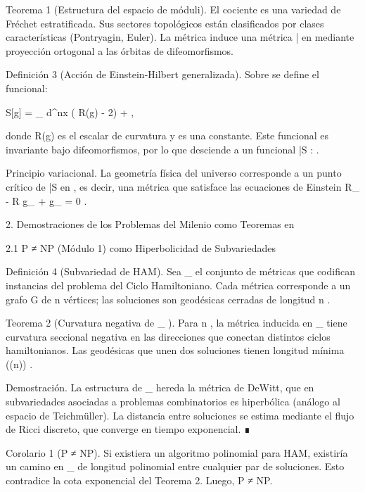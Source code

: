 \documentclass[12pt,a4paper]{book}
\begin{document}
Teorema 1 (Estructura del espacio de móduli). El cociente    es una variedad de Fréchet estratificada. Sus sectores topológicos están clasificados por clases características (Pontryagin, Euler). La métrica    induce una métrica  \bar{}  en    mediante proyección ortogonal a las órbitas de difeomorfismos.

Definición 3 (Acción de Einstein-Hilbert generalizada). Sobre    se define el funcional:

S[g] = \int_{} d^nx  \left( R(g) - 2\Lambda \right) + ,

donde  R(g)  es el escalar de curvatura y  \Lambda  es una constante. Este funcional es invariante bajo difeomorfismos, por lo que desciende a un funcional  \bar{S} :  \to {} .

Principio variacional. La geometría física del universo corresponde a un punto crítico de  \bar{S}  en   , es decir, una métrica que satisface las ecuaciones de Einstein  R_{\mu\nu} - R g_{\mu\nu} + \Lambda g_{\mu\nu} = 0 .

2. Demostraciones de los Problemas del Milenio como Teoremas en   

2.1 P ≠ NP (Módulo 1) como Hiperbolicidad de Subvariedades

Definición 4 (Subvariedad de HAM). Sea  _{} \subset {}  el conjunto de métricas que codifican instancias del problema del Ciclo Hamiltoniano. Cada métrica corresponde a un grafo  G  de  n  vértices; las soluciones son geodésicas cerradas de longitud  n .

Teorema 2 (Curvatura negativa de  _{} ). Para  n  , la métrica inducida en  _{}  tiene curvatura seccional negativa en las direcciones que conectan distintos ciclos hamiltonianos. Las geodésicas que unen dos soluciones tienen longitud mínima  \exp(\Omega(n)) .

Demostración. La estructura de  _{}  hereda la métrica de DeWitt, que en subvariedades asociadas a problemas combinatorios es hiperbólica (análogo al espacio de Teichmüller). La distancia entre soluciones se estima mediante el flujo de Ricci discreto, que converge en tiempo exponencial. ∎

Corolario 1 (P ≠ NP). Si existiera un algoritmo polinomial para HAM, existiría un camino en  _{}  de longitud polinomial entre cualquier par de soluciones. Esto contradice la cota exponencial del Teorema 2. Luego, P ≠ NP.
\end{document}
